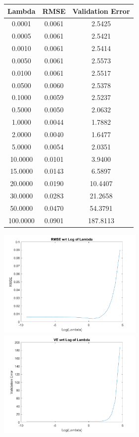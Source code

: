 \documentclass[a4paper,14pt]{article}
\numberwithin{definition}{section}
\numberwithin{mytheorem}{subsection}
\begin{document}
\begin{center}
    \begin{tabular}{|c|c|c|}
        \hline
        Lambda	&	RMSE  &	Validation Error\\
        \hline
        0.0001  &  0.0061 &   2.5425\\
        0.0005  & 0.0061  &  2.5421\\
        0.0010  &  0.0061 &   2.5414\\
        0.0050  &  0.0061 &  2.5573\\
        0.0100  &  0.0061 &  2.5517\\
        0.0500  &  0.0060 &   2.5378\\
        0.1000  & 0.0059  &  2.5237\\
        0.5000  &  0.0050 &   2.0632\\
        1.0000  &  0.0044 &   1.7882\\
        \hline
        \rowcolor{highlight}
        2.0000  &  0.0040 &   1.6477\\
        \hline
        5.0000  &  0.0054 &   2.0351\\
       10.0000  &  0.0101 &   3.9400\\
       15.0000  &  0.0143 &   6.5897\\
       20.0000  &  0.0190 &  10.4407\\
       30.0000  &  0.0283 &  21.2658\\
       50.0000  &  0.0470 &  54.3791\\
      100.0000  &  0.0901 & 187.8113\\
        \hline
    \end{tabular}
    \end{center}


\includegraphics[width=7cm]{RMSE.png}
\includegraphics[width=7cm]{VE.png}
\end{document}
